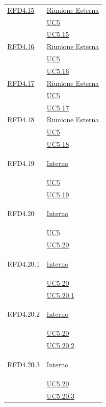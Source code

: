 \begin{longtable}{|>{\centering}m{5cm}|m{5cm}<{\centering}|}
\hyperlink{RFD4.15}{RFD4.15} & \hyperlink{Riunione Esterna}{Riunione Esterna}\\
& \hyperref[UC5]{UC5}\\
& \hyperref[UC5.15]{UC5.15}\\ \hline

\hyperlink{RFD4.16}{RFD4.16} & \hyperlink{Riunione Esterna}{Riunione Esterna}\\
& \hyperref[UC5]{UC5}\\
& \hyperref[UC5.16]{UC5.16}\\ \hline

\hyperlink{RFD4.17}{RFD4.17} & \hyperlink{Riunione Esterna}{Riunione Esterna}\\
& \hyperref[UC5]{UC5}\\
& \hyperref[UC5.17]{UC5.17}\\ \hline

\hyperlink{RFD4.18}{RFD4.18} & \hyperlink{Riunione Esterna}{Riunione Esterna}\\
& \hyperref[UC5]{UC5}\\
& \hyperref[UC5.18]{UC5.18}\\ \hline

\hypertarget{RFD4.19}{RFD4.19} & \hyperlink{Interno}{Interno}\\
&\hyperref[UC5]{UC5}\\
&\hyperref[UC5.19]{UC5.19}\\ \hline

\hypertarget{RFD4.20}{RFD4.20} & \hyperlink{Interno}{Interno}\\
&\hyperref[UC5]{UC5}\\
&\hyperref[UC5.20]{UC5.20}\\ \hline

\hypertarget{RFD4.20.1}{RFD4.20.1} & \hyperlink{Interno}{Interno}\\
&\hyperref[UC5.20]{UC5.20}\\
&\hyperref[UC5.20.1]{UC5.20.1}\\ \hline

\hypertarget{RFD4.20.2}{RFD4.20.2} & \hyperlink{Interno}{Interno}\\
&\hyperref[UC5.20]{UC5.20}\\
&\hyperref[UC5.20.2]{UC5.20.2}\\ \hline

\hypertarget{RFD4.20.3}{RFD4.20.3} & \hyperlink{Interno}{Interno}\\
&\hyperref[UC5.20]{UC5.20}\\
&\hyperref[UC5.20.3]{UC5.20.3}\\ \hline


\end{longtable}
